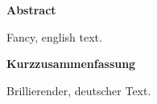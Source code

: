 \begin{center}
	\Large \textbf{Abstract}
\end{center}

Fancy, english text.


\begin{center}
\Large \textbf{Kurzzusammenfassung}
\end{center}

Brillierender, deutscher Text.